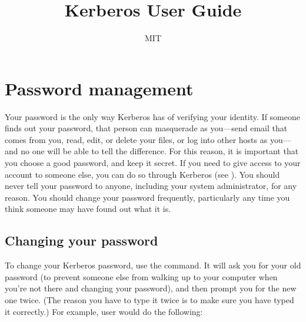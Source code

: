 \documentclass[letterpaper,10pt,english]{sphinxmanual}
\title{Kerberos User Guide}
\date{ }
\author{MIT}
\begin{document}
\pagestyle{empty}
\sphinxmaketitle
\pagestyle{plain}
\sphinxtableofcontents
\pagestyle{normal}
\label{\detokenize{user/index::doc}}



\chapter{Password management}
\label{\detokenize{user/pwd_mgmt:password-management}}\label{\detokenize{user/pwd_mgmt::doc}}
\sphinxAtStartPar
Your password is the only way Kerberos has of verifying your identity.
If someone finds out your password, that person can masquerade as
you—send email that comes from you, read, edit, or delete your files,
or log into other hosts as you—and no one will be able to tell the
difference.  For this reason, it is important that you choose a good
password, and keep it secret.  If you need to give access to your
account to someone else, you can do so through Kerberos (see
{\hyperref[\detokenize{user/pwd_mgmt:grant-access}]{}}).  You should never tell your password to anyone,
including your system administrator, for any reason.  You should
change your password frequently, particularly any time you think
someone may have found out what it is.


\section{Changing your password}
\label{\detokenize{user/pwd_mgmt:changing-your-password}}
\sphinxAtStartPar
To change your Kerberos password, use the {\hyperref[\detokenize{user/user_commands/kpasswd:kpasswd-1}]{}} command.
It will ask you for your old password (to prevent someone else from
walking up to your computer when you’re not there and changing your
password), and then prompt you for the new one twice.  (The reason you
have to type it twice is to make sure you have typed it correctly.)
For example, user  would do the following:

\begin{sphinxVerbatim}[commandchars=\\\{\}]
 
          
          
         
 
\end{sphinxVerbatim}
\end{document}
